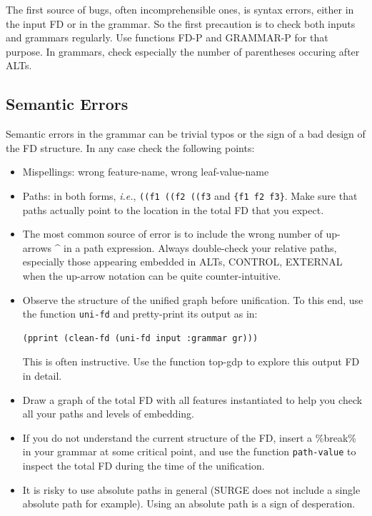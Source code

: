\documentclass[10pt,a4paper]{report}
\begin{document}
The first source of bugs, often incomprehensible ones, is syntax errors,
either in the input FD or in the grammar.  So the first precaution is to
check both inputs and grammars regularly.  Use functions FD-P and GRAMMAR-P
for that purpose.  In grammars, check especially the number of parentheses
occuring after ALTs.

\subsection{Semantic Errors}

Semantic errors in the grammar can be trivial typos or the sign of a bad
design of the FD structure.  In any case check the following points:

\begin{itemize}
\item Mispellings: wrong feature-name, wrong leaf-value-name

\item Paths: in both forms, {\em i.e.}, {\tt ((f1 ((f2 ((f3} and {\tt \{f1 f2 f3\}}.  Make
sure that paths actually point to the location in the total FD that you
expect.  

\item The most common source of error is to include the wrong number of up-arrows
\^{} in a path expression.  Always double-check your relative paths,
especially those appearing embedded in ALTs, CONTROL, EXTERNAL when the
up-arrow notation can be quite counter-intuitive.

\item Observe the structure of the unified graph before unification.  To this
end, use the function {\tt uni-fd} and pretty-print its output as in:
\begin{lstlisting}
(pprint (clean-fd (uni-fd input :grammar gr)))
\end{lstlisting}
This is often instructive.  Use the function top-gdp to explore this output
FD in detail.

\item Draw a graph of the total FD with all features instantiated to help you
check all your paths and levels of embedding.

\item If you do not understand the current structure of the FD, insert a \%break\%
in your grammar at some critical point, and use the function {\tt path-value}
to inspect the total FD during the time of the unification.

\item It is risky to use absolute paths in general (SURGE does not include a
single absolute path for example).  Using an absolute path is a sign of
desperation. 
\end{itemize}
\end{document}
